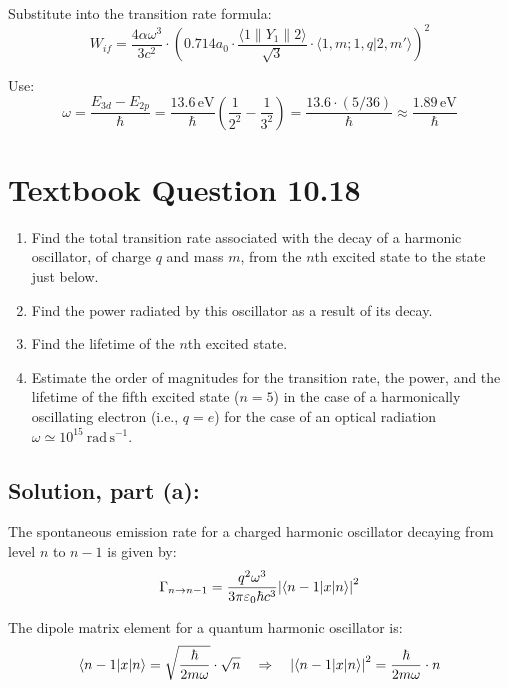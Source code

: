\documentclass[12pt]{article}
\begin{document}
        Substitute into the transition rate formula:
        \[
            W_{if} = \frac{4 \alpha \omega^3}{3c^2} 
            \cdot \left(0.714 a_0 \cdot \frac{\langle 1 \parallel Y_1 \parallel 2 \rangle}{\sqrt{3}} \cdot 
            \langle 1, m; 1, q | 2, m' \rangle \right)^2
        \]
        
        Use:
        \[
            \omega = \frac{E_{3d} - E_{2p}}{\hbar} 
            = \frac{13.6\, \text{eV}}{\hbar} \left( \frac{1}{2^2} - \frac{1}{3^2} \right)
            = \frac{13.6 \cdot (5/36)}{\hbar} \approx \frac{1.89\, \text{eV}}{\hbar}
        \]


\section{Textbook Question 10.18}
    \begin{enumerate}
        \item[(a)] Find the total transition rate associated with the decay of a harmonic oscillator, of charge $q$ and mass $m$, from the $n$th excited state to the state just below.
        
        \item[(b)] Find the power radiated by this oscillator as a result of its decay.
        
        \item[(c)] Find the lifetime of the $n$th excited state.
        
        \item[(d)] Estimate the order of magnitudes for the transition rate, the power, and the lifetime of the fifth excited state ($n = 5$) in the case of a harmonically oscillating electron (i.e., $q = e$) for the case of an optical radiation $\omega \simeq 10^{15}~\text{rad}\,\text{s}^{-1}$.
    \end{enumerate}

    \subsection{Solution, part (a):}
        The spontaneous emission rate for a charged harmonic oscillator decaying from level \( n \) to \( n-1 \) is given by:
        \[
            \Gamma_{n \to n-1} = \frac{q^2 \omega^3}{3\pi \varepsilon_0 \hbar c^3} \abs{\langle n-1 | x | n \rangle}^2
        \]
        
        The dipole matrix element for a quantum harmonic oscillator is:
        \[
            \langle n-1 | x | n \rangle = \sqrt{\frac{\hbar}{2m\omega}} \cdot \sqrt{n}
            \quad \Rightarrow \quad
            \abs{\langle n-1 | x | n \rangle}^2 = \frac{\hbar}{2m\omega} \cdot n
        \]
        
\end{document}
